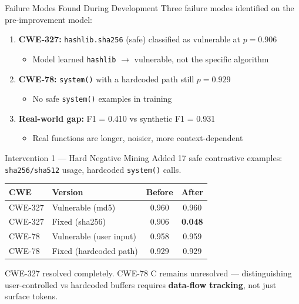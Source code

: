 \documentclass[aspectratio=169]{beamer}
\newcommand{\good}[1]{\textcolor{green!60!black}{#1}}
\newcommand{\bad}[1]{\textcolor{red!70!black}{#1}}
\begin{document}
\begin{frame}{Failure Modes Found During Development}
  Three failure modes identified on the pre-improvement model:

  \begin{enumerate}
    \item \textbf{CWE-327:} \texttt{hashlib.sha256} (safe) classified as vulnerable at $p = 0.906$
      \begin{itemize}
        \item Model learned \texttt{hashlib} $\to$ vulnerable, not the specific algorithm
      \end{itemize}
    \item \textbf{CWE-78:} \texttt{system()} with a hardcoded path still $p = 0.929$
      \begin{itemize}
        \item No safe \texttt{system()} examples in training
      \end{itemize}
    \item \textbf{Real-world gap:} F1 = 0.410 vs synthetic F1 = 0.931
      \begin{itemize}
        \item Real functions are longer, noisier, more context-dependent
      \end{itemize}
  \end{enumerate}
\end{frame}

\begin{frame}{Intervention 1 — Hard Negative Mining}
  Added 17 safe contrastive examples: \texttt{sha256/sha512} usage, hardcoded \texttt{system()} calls.

  \vspace{0.5em}
  \begin{center}
    \begin{tabular}{llcc}
      \toprule
      CWE & Version & Before & After \\
      \midrule
      CWE-327 & Vulnerable (md5)   & 0.960 & 0.960 \\
      CWE-327 & \good{Fixed (sha256)} & 0.906 & \good{\textbf{0.048}} \\
      CWE-78  & Vulnerable (user input) & 0.958 & 0.959 \\
      CWE-78  & \bad{Fixed (hardcoded path)} & 0.929 & \bad{0.929} \\
      \bottomrule
    \end{tabular}
  \end{center}

  \vspace{0.3em}
  CWE-327 resolved completely. CWE-78 C remains unresolved ---
  distinguishing user-controlled vs hardcoded buffers requires \textbf{data-flow tracking},
  not just surface tokens.
\end{frame}
\end{document}
